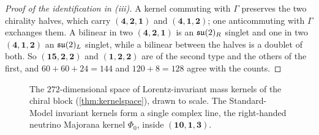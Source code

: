 \begin{proof}[Proof of the identification in (iii)]
A kernel commuting with $\Gamma$ preserves the two chirality halves, which carry $(\mathbf4,\mathbf2,\mathbf1)$ and $(\mathbf4,\mathbf1,\mathbf2)$; one anticommuting with
$\Gamma$ exchanges them. A bilinear in two $(\mathbf4,\mathbf2,\mathbf1)$ is an $\mathfrak{su}(2)_R$ singlet and one in two $(\mathbf4,\mathbf1,\mathbf2)$ an $\mathfrak{su}(2)_L$ singlet, while a
bilinear between the halves is a doublet of both. So $(\mathbf{15},\mathbf2,\mathbf2)$ and $(\mathbf1,\mathbf2,\mathbf2)$ are of the second type and the others of
the first, and $60+60+24=144$ and $120+8=128$ agree with the counts.
\end{proof}

\begin{figure}[t]
\centering
{}
\caption{The $272$-dimensional space of Lorentz-invariant mass kernels of the chiral block (\cref{thm:kernelspace}), drawn to scale. The
Standard-Model invariant kernels form a single complex line, the right-handed neutrino Majorana kernel $\Phi_0$, inside $(\mathbf{10},\mathbf1,\mathbf3)$.}
\label{fig:kernels}
\end{figure}

